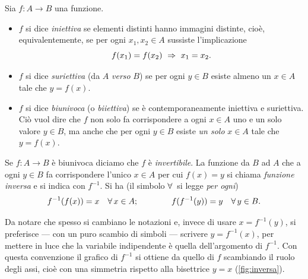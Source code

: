\begin{definizione}
Sia $f\colon A\to B$ una funzione.
\begin{itemize}
  \item $f$ si dice \emph{iniettiva} se elementi distinti hanno immagini distinte, cioè,
  equivalentemente, se per ogni $x_{1},x_{2}\in A$ sussiste l'implicazione
  \begin{equation}\label{eq:iniettiva}
    f(x_{1})=f(x_{2}) \ \Rightarrow\ x_{1}=x_{2}.
  \end{equation}
  \item $f$ si dice \emph{suriettiva} (da $A$ \emph{verso} $B$) se per ogni $y\in B$
  esiste almeno un $x\in A$ tale che $y=f(x)$.
  \item $f$ si dice \emph{biunivoca} (o \emph{biiettiva}) se è contemporaneamente
  iniettiva e suriettiva. Ciò vuol dire che $f$ non solo fa corrispondere a ogni $x\in A$
  uno e un solo valore $y\in B$, ma anche che per ogni $y\in B$ esiste \emph{un solo}
  $x\in A$ tale che $y=f(x)$.
\end{itemize}
\end{definizione}


\begin{definizione}
Se $f\colon A\to B$ è biunivoca diciamo che $f$ è \emph{invertibile}. La funzione da $B$
ad $A$ che a ogni $y\in B$ fa corrispondere l'unico $x\in A$ per cui $f(x)=y$ si chiama
\emph{funzione inversa} e si indica con $f^{-1}$. Si ha (il simbolo $\forall\,$ si legge
\emph{per ogni})
\begin{equation}\label{eq:inversa}
  f^{-1}(f(x))=x \quad\forall\, x\in A; \qquad\qquad f(f^{-1}(y))=y \quad\forall\, y\in B.
\end{equation}
\end{definizione}

Da notare che spesso si cambiano le notazioni e, invece di usare $x=f^{-1}(y)$, si
preferisce --- con un puro scambio di simboli --- scrivere $y=f^{-1}(x)$, per mettere in
luce che la variabile indipendente è quella dell'argomento di $f^{-1}$. Con questa
convenzione il grafico di $f^{-1}$ si ottiene da quello di $f$ scambiando il ruolo degli
assi, cioè con una simmetria rispetto alla bisettrice $y=x$ (\cref{fig:inversa}).

